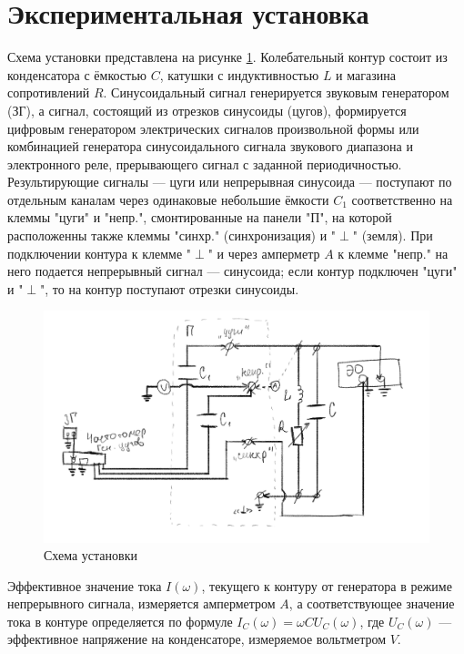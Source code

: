 \documentclass[a4paper, 12pt]{article}
\begin{document}
\section{Экспериментальная установка}

Схема установки представлена на рисунке \ref{fig:set}. Колебательный контур состоит из конденсатора с ёмкостью
$C$, катушки с индуктивностью $L$ и магазина сопротивлений $R$. Синусоидальный сигнал генерируется звуковым
генератором (ЗГ), а сигнал, состоящий из отрезков синусоиды (цугов), формируется цифровым генератором электрических
сигналов произвольной формы или комбинацией генератора синусоидального сигнала звукового диапазона и электронного 
реле, прерывающего сигнал с заданной периодичностью. Результирующие сигналы --- цуги или непрерывная синусоида 
--- поступают по отдельным каналам через одинаковые небольшие ёмкости $C_1$ соответственно на клеммы "цуги" и "непр."{},
смонтированные на панели "П"{}, на которой расположенны также клеммы "синхр." (синхронизация) и "$\perp$" (земля).
При подключении контура к клемме "$\perp$"{} и через амперметр $A$ к клемме "непр."{} на него подается непрерывный
сигнал --- синусоида; если контур подключен "цуги"{} и "$\perp$"{}, то на контур поступают отрезки синусоиды. 

\begin{figure}[h]
    \centering
    \includegraphics[width=1\textwidth]{set}
    \caption{Схема установки}
    \label{fig:set}
\end{figure}

Эффективное значение тока $I(\omega)$, текущего к контуру от генератора в режиме непрерывного сигнала, 
измеряется амперметром $A$, а соответствующее значение тока в контуре определяется по формуле $I_C(\omega) = \omega C U_C (\omega)$,
где $U_C(\omega)$ --- эффективное напряжение на конденсаторе, измеряемое вольтметром $V$.
\end{document}
